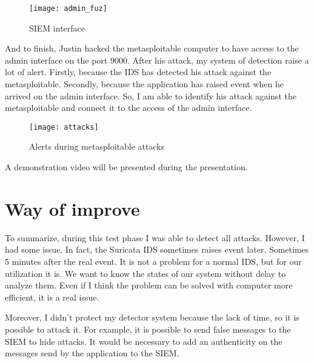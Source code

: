 \begin{figure}[h]
  \centering
  \texttt{[image: admin\_fuz]}
  \caption{SIEM interface}
  \label{fig:fuzz}
\end{figure}


And to finish, Justin hacked the metasploitable computer to have access to the admin interface on the port 9000.
After his attack, my system of detection raise a lot of alert. Firstly, because the IDS has detected his attack
against the metasploitable. Secondly, because the application has raised event when he arrived on the admin
interface. So, I am able to identify his attack against the metasploitable and connect it to the access of the
admin interface.


\begin{figure}[h]
  \centering
  \texttt{[image: attacks]}
  \caption{Alerts during metasploitable attacks}
  \label{fig:attcks}
\end{figure}

A demonstration video will be presented during the presentation.


\section{Way of improve}

To summarize, during this test phase I was able to detect all attacks. However, I had some issue. In fact, the
Suricata IDS sometimes raises event later. Sometimes 5 minutes after the real event. It is not a problem for a
normal IDS, but for our utilization it is. We want to know the states of our system without delay to analyze them.
Even if I think the problem can be solved with computer more efficient, it is a real issue.

Moreover, I didn't protect my detector system because the lack of time, so it is possible to attack it. For
example, it is possible to send false messages to the SIEM to hide attacks. It would be necessary to add an
authenticity on the messages send by the application to the SIEM.




